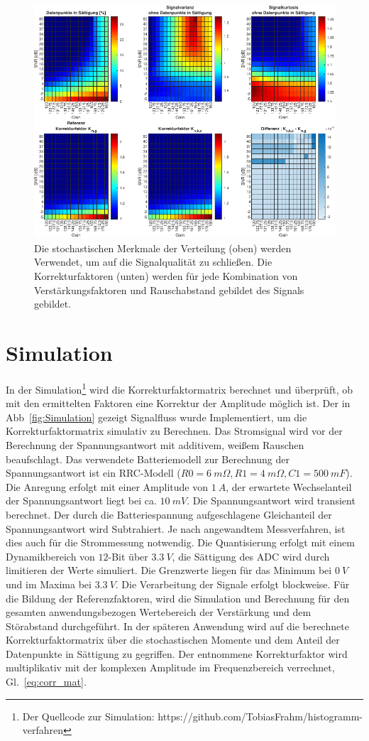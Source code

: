 \begin{figure}[th!]
	\centering
	\includegraphics[width=.9\textwidth]{../img/lut.pdf}
	\caption{Die stochastischen Merkmale der Verteilung (oben) werden Verwendet, um auf die Signalqualität zu schließen. Die Korrekturfaktoren (unten) werden für jede Kombination von Verstärkungsfaktoren und Rauschabstand gebildet des Signals gebildet.}
	\label{fig:lut} 
\end{figure}


\section{Simulation}

In der Simulation\footnote[2]{Der Quellcode zur Simulation: https://github.com/TobiasFrahm/histogramm-verfahren} wird die Korrekturfaktormatrix berechnet und überprüft, ob mit den ermittelten Faktoren eine Korrektur der Amplitude möglich ist. 
Der in Abb~\ref{fig:Simulation} gezeigt Signalfluss wurde Implementiert, um die Korrekturfaktormatrix simulativ zu Berechnen. Das Stromsignal wird vor der Berechnung der Spannungsantwort mit additivem, weißem Rauschen beaufschlagt. Das verwendete Batteriemodell zur Berechnung der Spannungsantwort ist ein RRC-Modell ($R0 = \SI{6}{m\Omega}, R1=\SI{4}{m\Omega}, C1=\SI{500}{mF}$). Die Anregung erfolgt mit einer Amplitude von $\SI{1}{A}$, der erwartete Wechselanteil der Spannungsantwort liegt bei ca. $\SI{10}{mV}$. Die Spannungsantwort wird transient berechnet. Der durch die Batteriespannung aufgeschlagene Gleichanteil der Spannungsantwort wird Subtrahiert. Je nach angewandtem Messverfahren, ist dies auch für die Strommessung notwendig. Die Quantisierung erfolgt mit einem Dynamikbereich von $12$-Bit über $\SI{3.3}{V}$, die Sättigung des ADC wird durch limitieren der Werte simuliert. Die Grenzwerte liegen für das Minimum bei $\SI{0}{V}$ und im Maxima bei $\SI{3.3}{V}$. Die Verarbeitung der Signale erfolgt blockweise. Für die Bildung der Referenzfaktoren, wird die Simulation und Berechnung für den gesamten anwendungsbezogen Wertebereich der Verstärkung und dem Störabstand durchgeführt. In der späteren Anwendung wird auf die berechnete Korrekturfaktormatrix über die stochastischen Momente und dem Anteil der Datenpunkte in Sättigung zu gegriffen. Der entnommene Korrekturfaktor wird multiplikativ mit der komplexen Amplitude im Frequenzbereich verrechnet, Gl.~\eqref{eq:corr_mat}. 


